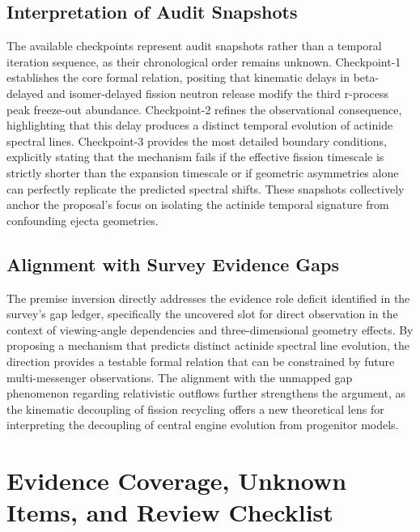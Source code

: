 \documentclass[conference]{IEEEtran}
\begin{document}
\subsection{Interpretation of Audit Snapshots}
The available checkpoints represent audit snapshots rather than a temporal iteration sequence, as their chronological order remains unknown. Checkpoint-1 establishes the core formal relation, positing that kinematic delays in beta-delayed and isomer-delayed fission neutron release modify the third r-process peak freeze-out abundance. Checkpoint-2 refines the observational consequence, highlighting that this delay produces a distinct temporal evolution of actinide spectral lines. Checkpoint-3 provides the most detailed boundary conditions, explicitly stating that the mechanism fails if the effective fission timescale is strictly shorter than the expansion timescale or if geometric asymmetries alone can perfectly replicate the predicted spectral shifts. These snapshots collectively anchor the proposal's focus on isolating the actinide temporal signature from confounding ejecta geometries.

\subsection{Alignment with Survey Evidence Gaps}
The premise inversion directly addresses the evidence role deficit identified in the survey's gap ledger, specifically the uncovered slot for direct observation in the context of viewing-angle dependencies and three-dimensional geometry effects. By proposing a mechanism that predicts distinct actinide spectral line evolution, the direction provides a testable formal relation that can be constrained by future multi-messenger observations. The alignment with the unmapped gap phenomenon regarding relativistic outflows further strengthens the argument, as the kinematic decoupling of fission recycling offers a new theoretical lens for interpreting the decoupling of central engine evolution from progenitor models.~\cite{cite_30c88fe46f23448d,cite_f16e65d18232c78c}

\section{Evidence Coverage, Unknown Items, and Review Checklist}
\end{document}

